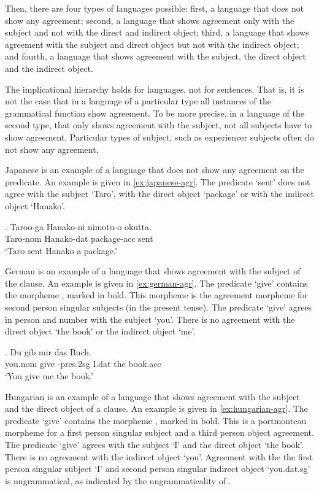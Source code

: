 Then, there are four types of languages possible: first, a language that does not show any agreement; second, a language that shows agreement only with the subject and not with the direct and indirect object; third, a language that shows agreement with the subject and direct object but not with the indirect object; and fourth, a language that shows agreement with the subject, the direct object and the indirect object.

The implicational hierarchy holds for languages, not for sentences. That is, it is not the case that in a language of a particular type all instances of the grammatical function show agreement. To be more precise, in a language of the second type, that only shows agreement with the subject, not all subjects have to show agreement. Particular types of subject, such as experiencer subjects often do not show any agreement.

Japanese is an example of a language that does not show any agreement on the predicate. An example is given in \ref{ex:japanese-agr}. The predicate  `sent' does not agree with the subject  `Taro', with the direct object  `package' or with the indirect object  `Hanako'.

\exg. Taroo-ga Hanako-ni nimotu-o okutta.\\
 Taro-\ac{nom} Hanako-\ac{dat} package-\ac{acc} sent\\
 `Taro sent Hanako a package.' \label{ex:japanese-agr}

German is an example of a language that shows agreement with the subject of the clause. An example is given in \ref{ex:german-agr}. The predicate  `give' contains the morpheme , marked in bold. This morpheme is the agreement morpheme for second person singular subjects (in the present tense). The predicate  `give' agrees in person and number with the subject  `you'. There is no agreement with the direct object  `the book' or the indirect object  `me'.

\exg. Du gib  mir {das Buch}.\\
 you.\ac{nom} give -\ac{pres}.2\ac{sg} I.\ac{dat} {the book.\ac{acc}}\\
 `You give me the book.' \label{ex:german-agr}

Hungarian is an example of a language that shows agreement with the subject and the direct object of a clause. An example is given in \ref{ex:hungarian-agr}. The predicate  `give' contains the morpheme , marked in bold. This is a portmonteau morpheme for a first person singular subject and a third person object agreement. The predicate  `give' agrees with the subject  `I' and the direct object  `the book'. There is no agreement with the indirect object  `you'. Agreement with the the first person singular subject  `I' and second person singular indirect object  `you.\ac{dat}.\ac{sg}' is ungrammatical, as indicated by the ungrammaticality of .

